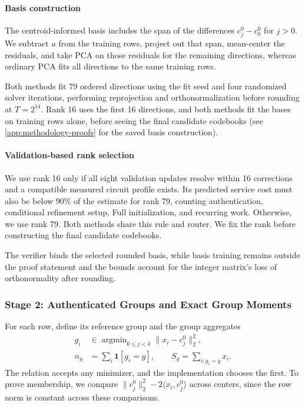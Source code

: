 \documentclass[5p,times,twocolumn]{elsarticle}
\begin{document}
\paragraph{Basis construction}
The centroid-informed basis includes the span of the differences $c^0_j-c^0_0$ for $j>0$. We subtract $a$ from the training rows, project out that span, mean-center the residuals, and take PCA on those residuals for the remaining directions, whereas ordinary PCA fits all directions to the same training rows.

Both methods fit 79 ordered directions using the fit seed and four randomized solver iterations, performing reprojection and orthonormalization before rounding at $T=2^{14}$. Rank 16 uses the first 16 directions, and both methods fit the bases on training rows alone, before seeing the final candidate codebooks (see \ref{app:methodology-proofs} for the saved basis construction).

\paragraph{Validation-based rank selection}
We use rank 16 only if all eight validation updates resolve within
16 corrections and a compatible measured circuit profile exists. Its
predicted service cost must also be below 90\% of the estimate for
rank 79, counting authentication, conditional refinement setup, Full
initialization, and recurring work. Otherwise, we use rank 79. Both
methods share this rule and router. We fix the rank before constructing
the final candidate codebooks.

The verifier binds the selected rounded basis, while basis training remains outside the proof statement and the bounds account for the integer matrix's loss of orthonormality after rounding.

\subsubsection{Stage 2: Authenticated Groups and Exact Group Moments}
\label{sec:methodology-groups}
For each row, define its reference group and the group aggregates
\begin{equation}
 \begin{aligned}
 g_i&\in\mathop{\arg\min}_{0\leq j<k}\|x_i-c^0_j\|_2^2,\\
 n_g&=\sum_i\mathbf1[g_i=g],\qquad S_g=\sum_{i:g_i=g}x_i.
 \end{aligned}
 \label{eq:methodology-groups}
\end{equation}
The relation accepts any minimizer, and the implementation chooses the first. To prove membership, we compare $\|c^0_j\|_2^2-2\langle x_i,c^0_j\rangle$ across centers, since the row norm is constant across these comparisons.
\end{document}
